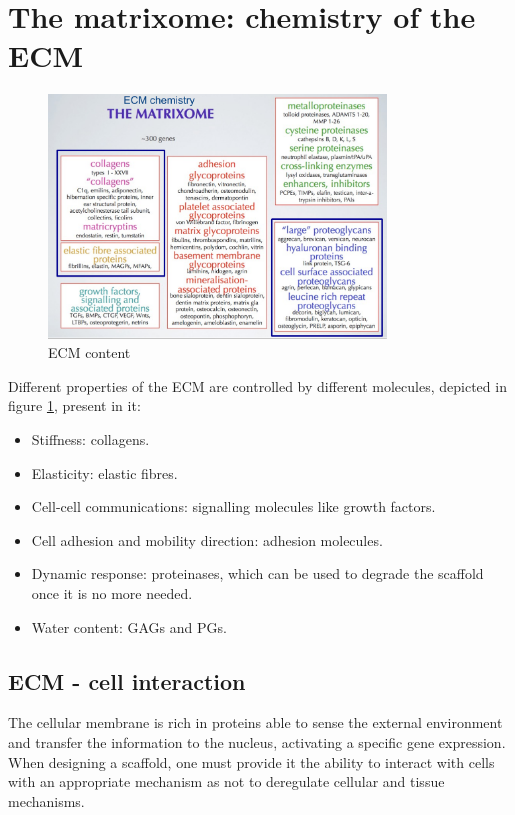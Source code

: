 \section{The matrixome: chemistry of the ECM}

\begin{figure}[ht]
	\centering
	\includegraphics[width=0.8\textwidth]{matrixome}
	\caption{ECM content}
	\label{fig:matrixome}
\end{figure}

Different properties of the ECM are controlled by different molecules, depicted in figure \ref{fig:matrixome}, present in it:

\begin{multicols}{2}
	\begin{itemize}
		\item Stiffness: collagens.
		\item Elasticity: elastic fibres.
		\item Cell-cell communications: signalling molecules like growth factors.
		\item Cell adhesion and mobility direction: adhesion molecules.
		\item Dynamic response: proteinases, which can be used to degrade the scaffold once it is no more needed.
		\item Water content: GAGs and PGs.
	\end{itemize}
\end{multicols}

	\subsection{ECM - cell interaction}
	The cellular membrane is rich in proteins able to sense the external environment and transfer the information to the nucleus, activating a specific gene expression.
	When designing a scaffold, one must provide it the ability to interact with cells with an appropriate mechanism as not to deregulate cellular and tissue mechanisms.

